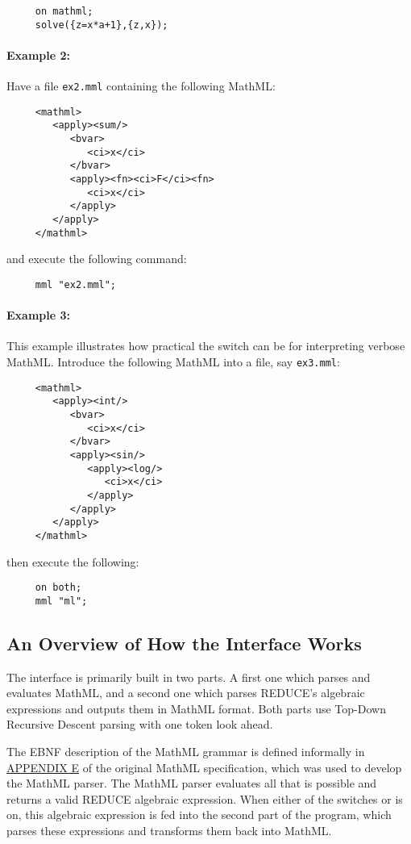\begin{verbatim}
     on mathml;
     solve({z=x*a+1},{z,x});
\end{verbatim}

\paragraph{Example 2:}
Have a file \texttt{ex2.mml} containing the following MathML:
\begin{verbatim}
     <mathml>
        <apply><sum/>
           <bvar>
              <ci>x</ci>
           </bvar>
           <apply><fn><ci>F</ci><fn>
              <ci>x</ci>
           </apply>
        </apply>
     </mathml>
\end{verbatim}
and execute the following command:
\begin{verbatim}
     mml "ex2.mml";
\end{verbatim}

\paragraph{Example 3:}
This example illustrates how practical the switch  can be for
interpreting verbose MathML.  Introduce the following MathML into a
file, say \texttt{ex3.mml}:
\begin{verbatim}
     <mathml>
        <apply><int/>
           <bvar>
              <ci>x</ci>
           </bvar>
           <apply><sin/>
              <apply><log/>
                 <ci>x</ci>
              </apply>
           </apply>
        </apply>
     </mathml>
\end{verbatim}
then execute the following:
\begin{verbatim}
     on both;
     mml "ml";
\end{verbatim}

\subsection{An Overview of How the Interface Works}

The interface is primarily built in two parts.  A first one which
parses and evaluates MathML, and a second one which parses REDUCE's
algebraic expressions and outputs them in MathML format.  Both parts
use Top-Down Recursive Descent parsing with one token look ahead.

The EBNF description of the MathML grammar is defined informally in
\href{https://www.w3.org/TR/REC-MathML/appendixE.html}{APPENDIX E} of
the original MathML specification, which was used to develop the
MathML parser.  The MathML parser evaluates all that is possible and
returns a valid REDUCE algebraic expression.  When either of the
switches  or  is on, this algebraic expression is
fed into the second part of the program, which parses these expressions
and transforms them back into MathML.

